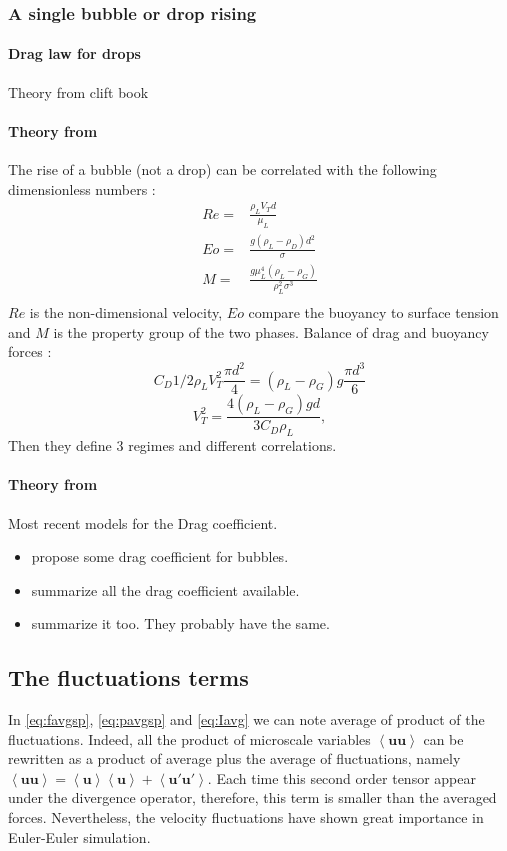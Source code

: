 \subsubsection{A single bubble or drop rising}
\paragraph*{Drag law for drops}
Theory from clift book
\paragraph*{Theory from \citet{tomiyama1998drag}}
The rise of a bubble (not a drop) can be correlated with the following dimensionless numbers :
\begin{align}
    Re = & \frac{\rho_L V_T d}{\mu_L}\\
    Eo = & \frac{g(\rho_L-\rho_D) d^2}{\sigma}\\
    M = & \frac{g\mu_L^4(\rho_L-\rho_G)}{\rho_L^2\sigma^3}\\
\end{align}
$Re$ is the non-dimensional velocity, $Eo$ compare the buoyancy to surface tension and $M$ is the property group of the two phases. 
Balance of drag and buoyancy forces :
\begin{equation}
    C_D 1/2 \rho_LV^2_T\frac{\pi d^2}{4}= (\rho_L-\rho_G)g\frac{\pi d^3}{6}
\end{equation}
\begin{equation}
    V^2_T = \frac{4(\rho_L-\rho_G)g d}{3C_D\rho_L},
\end{equation}
Then they define 3 regimes and different correlations. 
\paragraph*{Theory from \citet{loth2008drag}}
Most recent models for the Drag coefficient. 
\begin{itemize}
    \item \cite{tomiyama1998drag} propose some drag coefficient for bubbles. 
    \item \cite{sporleder2012population} summarize all the drag coefficient available.
    \item \citet{gemello2018modelling} summarize it too. They probably have the same. 
\end{itemize}
\subsection{The fluctuations terms}
In \ref{eq:favgsp}, \ref{eq:pavgsp} and \ref{eq:Iavg} we can note average of product of the fluctuations. 
Indeed, all the product of microscale variables $\left<\bm{uu}\right>$ can be rewritten as a product of average plus the average of fluctuations, namely $\left<\bm{uu}\right> = \left<\bm{u}\right>\left<\bm{u}\right> + \left<\bm{u'u'}\right>$. 
Each time this second order tensor appear under the divergence operator, therefore, this term is smaller than the averaged forces. 
Nevertheless, the velocity fluctuations have shown great importance in Euler-Euler simulation. 
